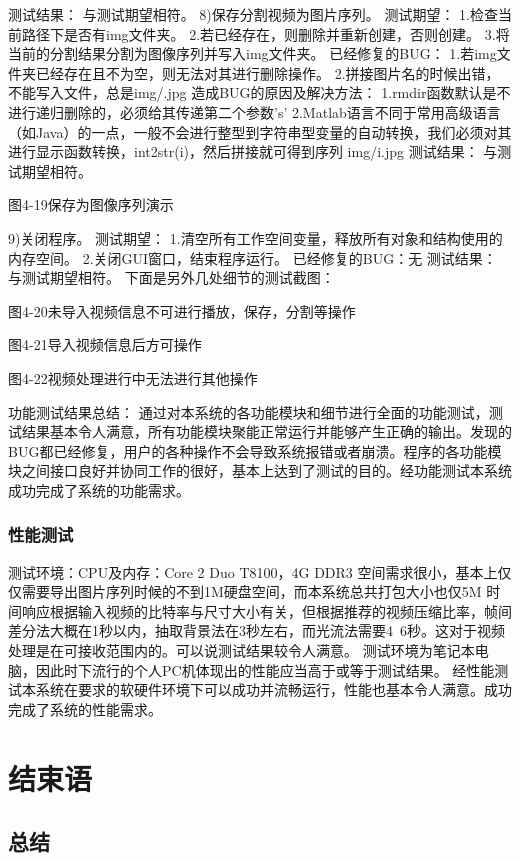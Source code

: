 \documentclass[18pt, twoside, a4paper, dvipdfm]{book}
\begin{document}
测试结果：
	与测试期望相符。
8)保存分割视频为图片序列。
测试期望：
1.检查当前路径下是否有img文件夹。
2.若已经存在，则删除并重新创建，否则创建。
3.将当前的分割结果分割为图像序列并写入img文件夹。
已经修复的BUG：
1.若img文件夹已经存在且不为空，则无法对其进行删除操作。
2.拼接图片名的时候出错，不能写入文件，总是img/.jpg
造成BUG的原因及解决方法：
1.rmdir函数默认是不进行递归删除的，必须给其传递第二个参数’s’
2.Matlab语言不同于常用高级语言（如Java）的一点，一般不会进行整型到字符串型变量的自动转换，我们必须对其进行显示函数转换，int2str(i)，然后拼接就可得到序列 img/i.jpg
测试结果：
	与测试期望相符。
 

图4-19保存为图像序列演示

9)关闭程序。
测试期望：
1.清空所有工作空间变量，释放所有对象和结构使用的内存空间。
2.关闭GUI窗口，结束程序运行。
已经修复的BUG：无
测试结果：
	与测试期望相符。
下面是另外几处细节的测试截图：
 

图4-20未导入视频信息不可进行播放，保存，分割等操作

 

图4-21导入视频信息后方可操作

 

图4-22视频处理进行中无法进行其他操作

功能测试结果总结：
	通过对本系统的各功能模块和细节进行全面的功能测试，测试结果基本令人满意，所有功能模块聚能正常运行并能够产生正确的输出。发现的BUG都已经修复，用户的各种操作不会导致系统报错或者崩溃。程序的各功能模块之间接口良好并协同工作的很好，基本上达到了测试的目的。经功能测试本系统成功完成了系统的功能需求。

\subsection{性能测试}

测试环境：CPU及内存：Core 2 Duo T8100，4G DDR3
	空间需求很小，基本上仅仅需要导出图片序列时候的不到1M硬盘空间，而本系统总共打包大小也仅5M
	时间响应根据输入视频的比特率与尺寸大小有关，但根据推荐的视频压缩比率，帧间差分法大概在1秒以内，抽取背景法在3秒左右，而光流法需要4~6秒。这对于视频处理是在可接收范围内的。可以说测试结果较令人满意。
测试环境为笔记本电脑，因此时下流行的个人PC机体现出的性能应当高于或等于测试结果。
	经性能测试本系统在要求的软硬件环境下可以成功并流畅运行，性能也基本令人满意。成功完成了系统的性能需求。

\chapter{结束语}
\section{总结}
\end{document}

